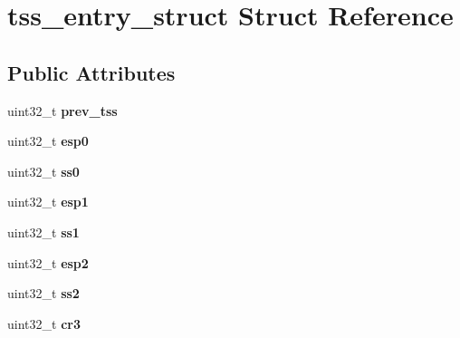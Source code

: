 \hypertarget{structtss__entry__struct}{}\section{tss\+\_\+entry\+\_\+struct Struct Reference}
\label{structtss__entry__struct}
\subsection*{Public Attributes}
\begin{DoxyCompactItemize}
\item 
\mbox{\label{structtss__entry__struct_a39cf24bcc092bbb6f58fa937158adaf5}} 
uint32\+\_\+t {\bfseries prev\+\_\+tss}
\item 
\mbox{\label{structtss__entry__struct_a229fac9e9b90978ffa932f2678c87640}} 
uint32\+\_\+t {\bfseries esp0}
\item 
\mbox{\label{structtss__entry__struct_a829b1e25ba63b118ec41a39b1d81ca2c}} 
uint32\+\_\+t {\bfseries ss0}
\item 
\mbox{\label{structtss__entry__struct_a9356b2ab1035c700a7aa471c95f02d2a}} 
uint32\+\_\+t {\bfseries esp1}
\item 
\mbox{\label{structtss__entry__struct_a87e96959633a37e83d37e992a6ad8314}} 
uint32\+\_\+t {\bfseries ss1}
\item 
\mbox{\label{structtss__entry__struct_adaa1a638f8c3dfcb79e5d1dcc9682ef6}} 
uint32\+\_\+t {\bfseries esp2}
\item 
\mbox{\label{structtss__entry__struct_ad3741f37ae4931540b8e4cedadb95176}} 
uint32\+\_\+t {\bfseries ss2}
\item 
\mbox{\label{structtss__entry__struct_a983a5fcabbb79244e8020da3f4b24656}} 
uint32\+\_\+t {\bfseries cr3}
\item 
\mbox{\label{structtss__entry__struct_aa0b4941c0a8416405ad031c1e02e6a8a}} 

\end{DoxyCompactItemize}
